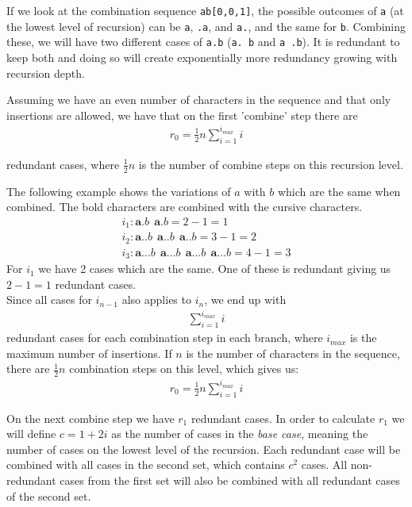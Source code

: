 \documentclass[12pt]{article}
\theoremstyle{definition}
\begin{document}
If we look at the combination sequence \texttt{ab[0,0,1]}, the possible outcomes of \texttt{a} (at the lowest level of recursion) can be \texttt{a}, \texttt{.a}, and \texttt{a.}, and the same for \texttt{b}. Combining these, we will have two different cases of \texttt{a.b} (\texttt{a. b} and \texttt{a .b}). It is redundant to keep both and doing so will create exponentially more redundancy growing with recursion depth.

Assuming we have an even number of characters in the sequence and that only insertions are allowed, we have that on the first 'combine' step there are
\begin{eqnarray}
	\label{r_0}
	r_0 = \frac{1}{2}n\sum^{i_{max}}_{i=1} i
\end{eqnarray}

redundant cases, where $\frac{1}{2}n$ is the number of combine steps on this recursion level.

\begin{example}
The following example shows the variations of $a$ with $b$ which are the same when combined. The bold characters are combined with the cursive characters.
\begin{eqnarray}
	i_{1}: \textbf{a.}b\ \ \textbf{a}.b = 2 - 1 = 1 \\
	i_{2}: \textbf{a..}b\ \ \textbf{a.}.b\ \ \textbf{a}..b = 3 - 1 = 2 \\
	i_{3}: \textbf{a...}b\ \ \textbf{a..}.b\ \ \textbf{a.}..b\ \ \textbf{a}...b = 4 - 1 = 3
\end{eqnarray}
For $i_{1}$ we have 2 cases which are the same. One of these is redundant giving us $2 - 1 = 1$ redundant cases. \\
Since all cases for $i_{n-1}$ also applies to $i_{n}$, we end up with
\begin{eqnarray}
	\sum_{i=1}^{i_{max}}i
\end{eqnarray}
redundant cases for each combination step in each branch, where $i_{max}$ is the maximum number of insertions. If $n$ is the number of characters in the sequence, there are $\frac{1}{2}n$ combination steps on this level, which gives us:
\begin{eqnarray}
	r_0 = \frac{1}{2}n\sum^{i_{max}}_{i=1} i
\end{eqnarray}
\end{example}

On the next combine step we have $r_1$ redundant cases. In order to calculate $r_1$ we will define $c = 1 + 2i$ as the number of cases in the \textit{base case}, meaning the number of cases on the lowest level of the recursion. Each redundant case will be combined with all cases in the second set, which contains $c^2$ cases. All non-redundant cases from the first set will also be combined with all redundant cases of the second set. 
\end{document}
